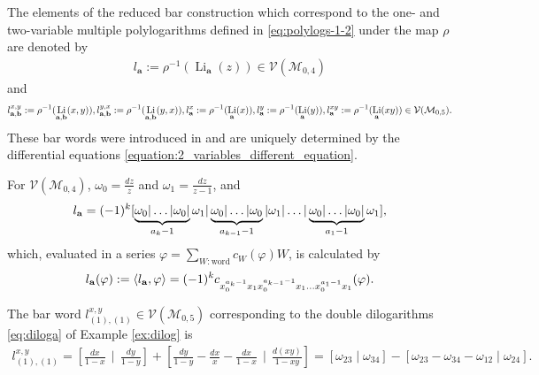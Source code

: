 \documentclass[a4paper,fleqn]{cas-sc}
\DeclareMathOperator{\Li}{Li}
\begin{document}
The elements of the reduced bar construction which correspond to the one- and two-variable multiple polylogarithms defined in \eqref{eq:polylogs-1-2} under the map $\rho$ are denoted by 
\begin{align*}
    l_{\mathbf{a}} :=\rho^{-1}(\Li_{\mathbf{a}}(z)) \in \mathcal{V}(\mathcal{M}_{0,4})
\end{align*}
and 
\begin{align*}
    l^{x,y}_{\bf{a},\bf{b}} :=\rho^{-1}(\Li_{\bold a,\bold b}(x,y)), l^{y,x}_{\bf{a},\bf{b}} :=\rho^{-1}(\Li_{\bold a,\bold b}(y,x)),
    l^{x}_{\bf{a}} :=\rho^{-1}(\Li_{\bold a}(x)), l^{y}_{\bf{a}} :=\rho^{-1}(\Li_{\bold a}(y)),
    l^{xy}_{\bf{a}} :=\rho^{-1}(\Li_{\bold a}(xy)) \in \mathcal{V}(\mathcal{M}_{0,5}).
\end{align*}
These bar words were introduced in \cite{Furusho2011} and are uniquely determined by the differential equations \eqref{equation:2_variables_different_equation}.

\begin{ex}
For $\mathcal{V}(\mathcal{M}_{0,4})$, $\omega_0=\frac{dz}{z}$ and $\omega_1=\frac{dz}{z-1}$, and
\begin{align*}
	l_{\bf{a}}=(-1)^k[\underbrace{\omega_0|\dots|\omega_0|}_{a_k-1}\omega_1|\underbrace{\omega_0|\dots |\omega_0}_{a_{k-1}-1}|\omega_1|\dots |\underbrace{\omega_0|\dots |\omega_0|}_{a_1-1}\omega_1],
\end{align*}
which, evaluated in a series $\varphi=\sum_{W:\text{word}}c_{W}(\varphi)W$, is calculated by 
\begin{align*}
    l_{\bf{a}}(\varphi):=\langle l_{\bf{a}},\varphi \rangle=(-1)^kc_{x^{a_k-1}_0x_1x^{a_{k-1}-1}_0x_1\dots x^{a_1-1}_0x_1}(\varphi).
\end{align*}
\end{ex}

\begin{ex}
The bar word $l^{x,y}_{(1),(1)}\in \mathcal{V}(\mathcal{M}_{0,5})$ corresponding to the double dilogarithms \eqref{eq:diloga} of Example \ref{ex:dilog} is 
\begin{align*}
l^{x,y}_{(1),(1)}= [\frac{dx}{1-x}\,\mid \,\frac{dy}{1-y}]+[\frac{dy}{1-y}-\frac{dx}{x}-\frac{dx}{1-x}\,\mid \,\frac{d(xy)}{1-xy}]
= [\omega_{23}\mid \omega_{34}]-[\omega_{23}-\omega_{34}-\omega_{12}\mid \omega_{24}].
\end{align*}
\end{ex}
\end{document}
